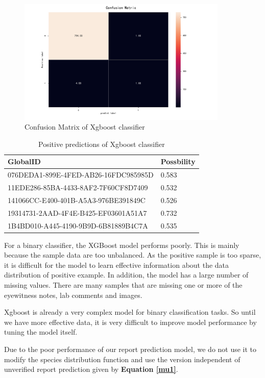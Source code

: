 \documentclass[12pt]{article}
\begin{document}
\begin{figure}[H]%
	\small
	\centering
	\includegraphics[width=10cm]{./pictures/xgb_CM.pdf}
	\caption{Confusion Matrix of Xgboost classifier}\label{xgb_CM}
\end{figure}
\begin{table}[htbp]
	\centering
	\caption{Positive predictions of Xgboost classifier}
    \begin{tabular}{ll}
		\toprule
		GlobalID & Possbility \\
		\midrule
		{076DEDA1-899E-4FED-AB26-16FDC985985D} & 0.583 \\
		\rowcolor{mygray}
		{11EDE286-85BA-4433-8AF2-7F60CF8D7409} & 0.532 \\
		{141066CC-E400-401B-A5A3-976BE391849C} & 0.526 \\
		\rowcolor{mygray}
		{19314731-2AAD-4F4E-B425-EF03601A51A7} & 0.732 \\
		{1B4BD010-A445-4190-9B9D-6B81889B4C7A} & 0.535 \\
		\bottomrule
		\end{tabular}%
	\label{tab:Positive_predictions}%
  \end{table}%
  
  
For a binary classifier, the XGBoost model performs poorly. This is mainly because the sample data are too unbalanced. As the positive sample is too sparse, it is difficult for the model to learn effective information about the data distribution of positive example. In addition, the model has a large number of missing values. There are many samples that are missing one or more of the eyewitness notes, lab comments and images.

Xgboost is already a very complex model for binary classification tasks. So until we have more effective data, it is very difficult to improve model performance by tuning the model itself.

Due to the poor performance of our report prediction model, we do not use it to modify the species distribution function and use the version independent of unverified report prediction given by \textbf{Equation \ref{mu1}}. 
\end{document}
